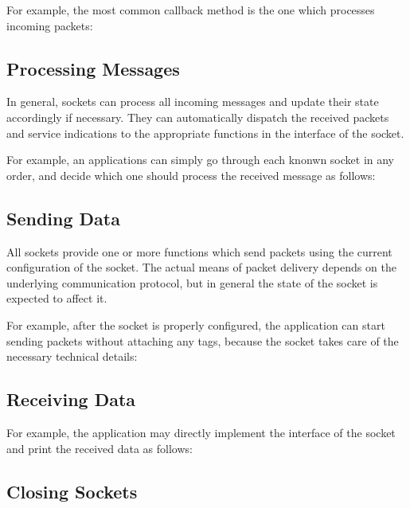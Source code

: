 For example, the most common callback method is the one which processes incoming
packets:


\subsection*{Processing Messages}

In general, sockets can process all incoming messages and update their state
accordingly if necessary. They can automatically dispatch the received packets
and service indications to the appropriate functions in the 
interface of the socket.

For example, an applications can simply go through each knonwn socket in any
order, and decide which one should process the received message as follows:


\subsection*{Sending Data}

All sockets provide one or more  functions which send packets using
the current configuration of the socket. The actual means of packet delivery
depends on the underlying communication protocol, but in general the state of
the socket is expected to affect it.

For example, after the socket is properly configured, the application can start
sending packets without attaching any tags, because the socket takes care of
the necessary technical details:


\subsection*{Receiving Data}

For example, the application may directly implement the 
interface of the socket and print the received data as follows:


\subsection*{Closing Sockets}

